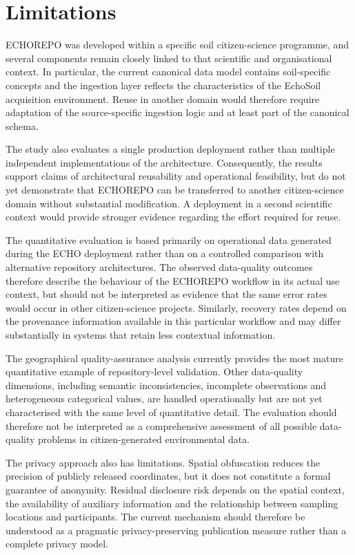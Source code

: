 \section{Limitations}

ECHOREPO was developed within a specific soil citizen-science programme, and several components remain closely linked to that scientific and organisational context. In particular, the current canonical data model contains soil-specific concepts and the ingestion layer reflects the characteristics of the EchoSoil acquisition environment. Reuse in another domain would therefore require adaptation of the source-specific ingestion logic and at least part of the canonical schema.

The study also evaluates a single production deployment rather than multiple independent implementations of the architecture. Consequently, the results support claims of architectural reusability and operational feasibility, but do not yet demonstrate that ECHOREPO can be transferred to another citizen-science domain without substantial modification. A deployment in a second scientific context would provide stronger evidence regarding the effort required for reuse.

The quantitative evaluation is based primarily on operational data generated during the ECHO deployment rather than on a controlled comparison with alternative repository architectures. The observed data-quality outcomes therefore describe the behaviour of the ECHOREPO workflow in its actual use context, but should not be interpreted as evidence that the same error rates would occur in other citizen-science projects. Similarly, recovery rates depend on the provenance information available in this particular workflow and may differ substantially in systems that retain less contextual information.

The geographical quality-assurance analysis currently provides the most mature quantitative example of repository-level validation. Other data-quality dimensions, including semantic inconsistencies, incomplete observations and heterogeneous categorical values, are handled operationally but are not yet characterised with the same level of quantitative detail. The evaluation should therefore not be interpreted as a comprehensive assessment of all possible data-quality problems in citizen-generated environmental data.

The privacy approach also has limitations. Spatial obfuscation reduces the precision of publicly released coordinates, but it does not constitute a formal guarantee of anonymity. Residual disclosure risk depends on the spatial context, the availability of auxiliary information and the relationship between sampling locations and participants. The current mechanism should therefore be understood as a pragmatic privacy-preserving publication measure rather than a complete privacy model.

